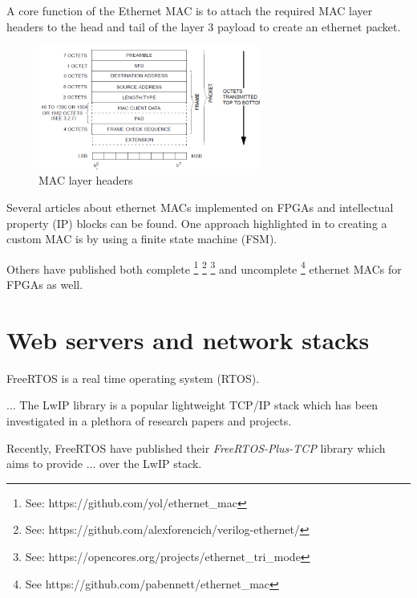 A core function of the Ethernet MAC is to attach the required MAC layer headers to the head and tail of the layer 3 payload to create an ethernet packet.

\begin{figure}[h]
    \centering
    \includegraphics[width=0.65\textwidth]{Images/mac_packet.png}
    \caption{MAC layer headers \cite{IEEE802.3-2012}}
    \label{fig:vul}
\end{figure}


Several articles \cite{OptimisedEthernetMAC} \cite{EthernetAXI} \cite{EthernetRMII} about ethernet MACs implemented on FPGAs and 
intellectual property (IP) blocks can be found. One approach highlighted in \cite{OptimisedEthernetMAC} to creating a custom MAC is by using a finite state 
machine (FSM). 

Others have published both complete \footnote[1]{See: https://github.com/yol/ethernet\_mac} \footnote[2]{See: https://github.com/alexforencich/verilog-ethernet/} 
\footnote[3]{See: https://opencores.org/projects/ethernet\_tri\_mode} and uncomplete
\footnote[4]{See https://github.com/pabennett/ethernet\_mac} ethernet MACs for FPGAs as well.




\section{Web servers and network stacks}

FreeRTOS is a real time operating system (RTOS). 

... The LwIP library is a popular lightweight TCP/IP stack which has been investigated in a plethora of research papers and projects. 

\cite{LwIPFPGAFirewall}
\cite{ImprovemntOptimLWIP}
\cite{OptimCortexLwIP}
\cite{IoTSurvey}

Recently, FreeRTOS have published their \textit{FreeRTOS-Plus-TCP} library which aims to provide ... over the LwIP stack. 






